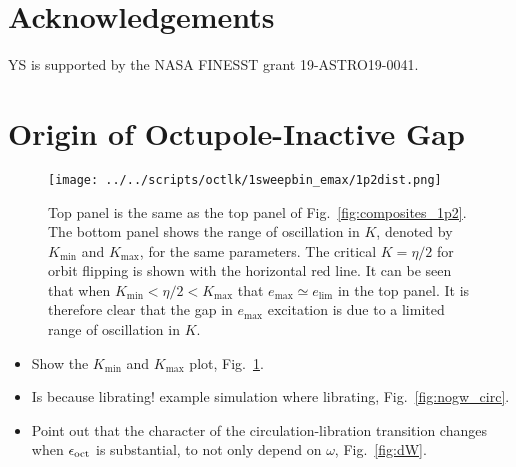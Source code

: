 \documentclass[
        fleqn,
        usenatbib,
    ]{mnras}
\newlength{\colummwidth}
\begin{document}
\section{Acknowledgements}\label{s:ack}

YS is supported by the NASA FINESST grant 19-ASTRO19-0041.%




\clearpage
\onecolumn

\appendix

\section{Origin of Octupole-Inactive Gap}\label{app:gap}

\begin{figure}
    \centering
    \texttt{[image: ../../scripts/octlk/1sweepbin\_emax/1p2dist.png]}
    \caption{Top panel is the same as the top panel of
    Fig.~\ref{fig:composites_1p2}. The bottom panel shows the range of
    oscillation in $K$, denoted by $K_{\min}$ and $K_{\max}$, for the same
    parameters. The critical $K = \eta / 2$ for orbit flipping is shown with the
    horizontal red line. It can be seen that when $K_{\min} < \eta / 2 <
    K_{\max}$ that $e_{\max} \simeq e_{\lim}$ in the top panel. It is therefore
    clear that the gap in $e_{\max}$ excitation is due to a limited range of
    oscillation in $K$.
    }\label{fig:kdist}
\end{figure}

\begin{itemize}
    \item Show the $K_{\min}$ and $K_{\max}$ plot, Fig.~\ref{fig:kdist}.

    \item Is because librating! example simulation where librating,
        Fig.~\ref{fig:nogw_circ}.

    \item Point out that the character of the circulation-libration transition
        changes when $\epsilon_{\rm oct}$ is substantial, to not only depend on
        $\omega$, Fig.~\ref{fig:dW}.
\end{itemize}
\end{document}
